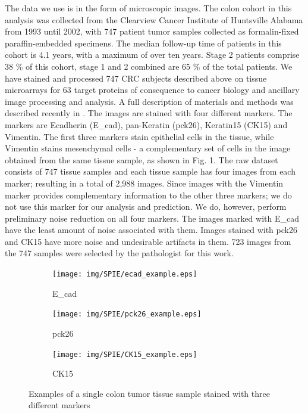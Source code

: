 The data we use is in the form of microscopic images. The colon cohort in this analysis was collected from the Clearview Cancer Institute of Huntsville Alabama from 1993 until 2002, with 747 patient tumor samples collected as formalin-fixed paraffin-embedded specimens. The median follow-up time of patients in this cohort is 4.1 years, with a maximum of over ten years. Stage 2 patients comprise 38 \% of this cohort, stage 1 and 2 combined are 65 \% of the total patients. We have stained and processed 747 CRC subjects described above on tissue microarrays for 63 target proteins of consequence to cancer biology and ancillary image processing and analysis. A full description of materials and methods was described recently in \cite{gerdes2013highly}.
The images are stained with four different markers. The markers are Ecadherin (E\_cad), pan-Keratin (pck26), Keratin15 (CK15) and Vimentin. The first three markers stain epithelial cells in the tissue, while Vimentin stains mesenchymal cells - a complementary set of cells in the image obtained from the same tissue sample, as shown in Fig. 1. The raw dataset consists of 747 tissue samples and each tissue sample has four images from each marker; resulting in a total of 2,988 images. Since images with the Vimentin marker provides complementary information to the other three markers; we do not use this marker for our analysis and prediction. We do, however, perform preliminary noise reduction on all four markers. The images marked with E\_cad have the least amount of noise associated with them. Images stained with pck26 and CK15 have more noise and undesirable artifacts in them. 723 images from the 747 samples were selected by the pathologist for this work.

\begin{figure}
    \centering
    \begin{subfigure}[b]{0.3\textwidth}
        \centering
        \texttt{[image: img/SPIE/ecad\_example.eps]}
        \caption{E\_cad}
        \label{fig:ecad_example}
    \end{subfigure}
    \hfill
    \begin{subfigure}[b]{0.3\textwidth}
        \centering
        \texttt{[image: img/SPIE/pck26\_example.eps]}
        \caption{pck26}
        \label{fig:pck26_example}
    \end{subfigure}
    \hfill
    \begin{subfigure}[b]{0.3\textwidth}
        \centering
        \texttt{[image: img/SPIE/CK15\_example.eps]}
        \caption{CK15}
        \label{fig:CK15_example}
    \end{subfigure}
    \caption{Examples of a single colon tumor tissue sample stained with three different markers}
    \label{fig:example_images}
\end{figure}

